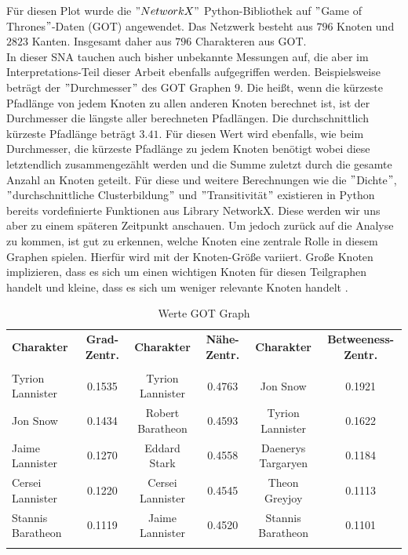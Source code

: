 Für diesen Plot wurde die $"NetworkX"$ Python-Bibliothek auf $"$Game of Thrones$"$-Daten (GOT) angewendet. Das Netzwerk besteht aus $796$ Knoten und $2823$ Kanten. Insgesamt daher aus $796$ Charakteren aus GOT.\\
In dieser SNA tauchen auch bisher unbekannte Messungen auf, die aber im Interpretations-Teil dieser Arbeit ebenfalls aufgegriffen werden. Beispielsweise beträgt der $"$Durchmesser$"$ des GOT Graphen $9$. Die heißt, wenn die kürzeste Pfadlänge von jedem Knoten zu allen anderen Knoten berechnet ist, ist der Durchmesser die längste aller berechneten Pfadlängen. Die durchschnittlich kürzeste Pfadlänge beträgt $3.41$. Für diesen Wert wird ebenfalls, wie beim Durchmesser, die kürzeste Pfadlänge zu jedem Knoten benötigt wobei diese letztendlich zusammengezählt werden und die Summe zuletzt durch die gesamte Anzahl an Knoten geteilt. Für diese und weitere Berechnungen wie die $"$Dichte$"$, $"$durchschnittliche Clusterbildung$"$ und $"$Transitivität$"$ existieren in Python bereits vordefinierte Funktionen aus Library NetworkX. Diese werden wir uns aber zu einem späteren Zeitpunkt anschauen. Um jedoch zurück auf die Analyse zu kommen, ist gut zu erkennen, welche Knoten eine zentrale Rolle in diesem Graphen spielen. Hierfür wird mit der Knoten-Größe variiert. Große Knoten implizieren, dass es sich um einen wichtigen Knoten für diesen Teilgraphen handelt und kleine, dass es sich um weniger relevante Knoten handelt \cite{GOT}. 
\begin{table}[h!]
\footnotesize
\caption{Werte GOT Graph}
\label{TableGOT}
\begin{tabular}{lccccc}\toprule 
\textbf{Charakter} &\textbf{Grad-Zentr.} & \textbf{Charakter} &\textbf{Nähe-Zentr.}  & \textbf{Charakter} &\textbf{Betweeness-Zentr.} \\
 &\\\midrule
  Tyrion Lannister & 0.1535  & Tyrion Lannister & 0.4763 & Jon Snow& 0.1921   \\
  Jon Snow & 0.1434 & Robert Baratheon & 0.4593 & Tyrion Lannister & 0.1622   \\
  Jaime Lannister & 0.1270  & Eddard Stark& 0.4558& Daenerys Targaryen & 0.1184   \\
  Cersei Lannister & 0.1220 & Cersei Lannister & 0.4545 & Theon Greyjoy & 0.1113   \\
  Stannis Baratheon & 0.1119 & Jaime Lannister & 0.4520 & Stannis Baratheon & 0.1101   \\
       
  \\\bottomrule
 \end{tabular}
 \end{table}
